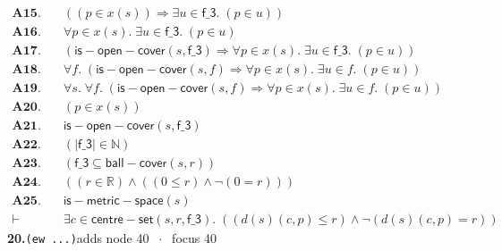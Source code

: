 \documentclass[11pt]{article}
\begin{document}
\begin{align*}
  \mathbf{A15.}\quad & ((p \in x(s)) \Rightarrow \exists u \in \mathsf{f\_3}.\; (p \in u)) \\
  \mathbf{A16.}\quad & \forall p \in x(s).\; \exists u \in \mathsf{f\_3}.\; (p \in u) \\
  \mathbf{A17.}\quad & (\mathsf{is{-}open{-}cover}(s, \mathsf{f\_3}) \Rightarrow \forall p \in x(s).\; \exists u \in \mathsf{f\_3}.\; (p \in u)) \\
  \mathbf{A18.}\quad & \forall f.\; (\mathsf{is{-}open{-}cover}(s, f) \Rightarrow \forall p \in x(s).\; \exists u \in f.\; (p \in u)) \\
  \mathbf{A19.}\quad & \forall s.\; \forall f.\; (\mathsf{is{-}open{-}cover}(s, f) \Rightarrow \forall p \in x(s).\; \exists u \in f.\; (p \in u)) \\
  \mathbf{A20.}\quad & (p \in x(s)) \\
  \mathbf{A21.}\quad & \mathsf{is{-}open{-}cover}(s, \mathsf{f\_3}) \\
  \mathbf{A22.}\quad & (|\mathsf{f\_3}| \in \mathbb{N}) \\
  \mathbf{A23.}\quad & (\mathsf{f\_3} \subseteq \mathsf{ball{-}cover}(s, r)) \\
  \mathbf{A24.}\quad & ((r \in \mathbb{R}) \wedge ((0 \leq r) \wedge \neg (0 = r))) \\
  \mathbf{A25.}\quad & \mathsf{is{-}metric{-}space}(s) \\
  \vdash\quad & \exists c \in \mathsf{centre{-}set}(s, r, \mathsf{f\_3}).\; ((d(s)(c, p) \leq r) \wedge \neg (d(s)(c, p) = r))
\end{align*}
\medskip\noindent\textbf{20.}\quad \texttt{(ew ...)}\hfill{\small adds node 40 $\;\cdot\;$ focus 40}\\[2pt]
\end{document}
